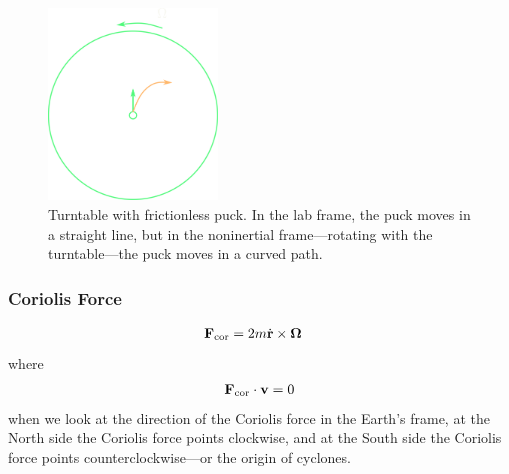 \documentclass[../main.tex]{subfiles}
\begin{document}
\begin{figure}[ht]
    \centering
    \captionsetup{width=0.8\textwidth}
    \includegraphics[width=0.4\textwidth]{turntable.png}
    \caption{Turntable with frictionless puck. In the lab frame, the puck moves in a straight line,
    but in the noninertial frame—rotating with the turntable—the puck moves in a curved path.}
\end{figure}
\subsubsection*{Coriolis Force}
\begin{align*}
    \vb F_{\text{cor}} &= 2m \dot{\vb r} \times \vb \Omega
\end{align*}
where
\begin{align*}
    \vb F_{\text{cor}} \cdot \vb v = 0
\end{align*}
when we look at the direction of the Coriolis force in the Earth's frame, at the North side the
Coriolis force points clockwise, and at the South side the Coriolis force points counterclockwise—or
the origin of cyclones. 
\end{document}
